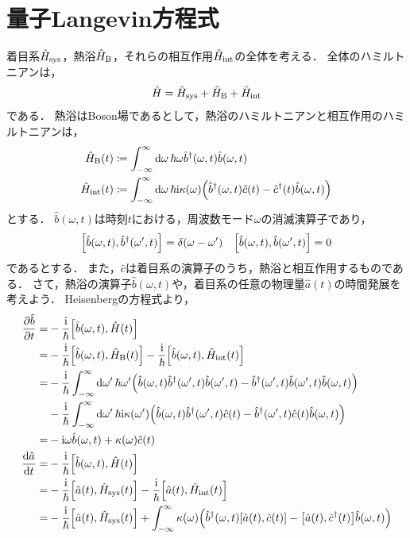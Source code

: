 \documentclass{report}
\begin{document}
    \section{量子Langevin方程式}
      着目系$\hat{H}_{\mathrm{sys}}$，熱浴$\hat{H}_{\mathrm{B}}$，それらの相互作用$\hat{H}_{\mathrm{int}}$の全体を考える．
      全体のハミルトニアンは，
      \begin{align}
        \hat{H} = \hat{H}_{\mathrm{sys}} + \hat{H}_{\mathrm{B}} + \hat{H}_{\mathrm{int}}
      \end{align}
      である．
      熱浴はBoson場であるとして，熱浴のハミルトニアンと相互作用のハミルトニアンは，
      \begin{align}
        \hat{H}_{\mathrm{B}}(t) &\coloneqq \int_{-\infty}^{\infty}\dd{\omega} \hbar\omega \hat{b}^{\dag}(\omega, t)\hat{b}(\omega, t) \\ 
        \hat{H}_{\mathrm{int}}(t) &\coloneqq \int_{-\infty}^{\infty}\dd{\omega} \hbar\mathrm{i}\kappa(\omega)\qty(\hat{b}^{\dag}(\omega, t)\hat{c}(t) - \hat{c}^{\dag}(t)\hat{b}(\omega, t))
      \end{align}
      とする．
      $\hat{b}(\omega, t)$は時刻$t$における，周波数モード$\omega$の消滅演算子であり，
      \begin{align}
        \qty[\hat{b}(\omega, t), \hat{b}^{\dag}(\omega', t)] = \delta(\omega - \omega')\quad \qty[\hat{b}(\omega, t), \hat{b}(\omega', t)] = 0
      \end{align}
      であるとする．
      また，$\hat{c}$は着目系の演算子のうち，熱浴と相互作用するものである．
      さて，熱浴の演算子$\hat{b}(\omega, t)$や，着目系の任意の物理量$\hat{a}(t)$の時間発展を考えよう．
      Heisenbergの方程式より，
      \begin{align}
        \pdv{\hat{b}}{t}(\omega, t) =& -\frac{\mathrm{i}}{\hbar}\qty[\hat{b}(\omega, t), \hat{H}(t)] \\ 
        =& -\frac{\mathrm{i}}{\hbar}\qty[\hat{b}(\omega, t), \hat{H}_{\mathrm{B}}(t)] - \frac{\mathrm{i}}{\hbar}\qty[\hat{b}(\omega, t), \hat{H}_{\mathrm{int}}(t)] \\ 
        =& -\frac{\mathrm{i}}{\hbar}\int_{-\infty}^{\infty}\dd{\omega'} \hbar\omega'\qty(\hat{b}(\omega, t)\hat{b}^{\dag}(\omega', t)\hat{b}(\omega', t) - \hat{b}^{\dag}(\omega', t)\hat{b}(\omega', t)\hat{b}(\omega, t)) \\ 
        &- \frac{\mathrm{i}}{\hbar}\int_{-\infty}^{\infty}\dd{\omega'} \hbar\mathrm{i}\kappa(\omega')\qty(\hat{b}(\omega, t)\hat{b}^{\dag}(\omega', t)\hat{c}(t) - \hat{b}^{\dag}(\omega', t)\hat{c}(t)\hat{b}(\omega, t)) \\ 
        =& -\mathrm{i}\omega\hat{b}(\omega, t) + \kappa(\omega)\hat{c}(t) \\ 
        \dv{\hat{a}}{t}(t) =& -\frac{\mathrm{i}}{\hbar}\qty[\hat{b}(\omega, t), \hat{H}(t)] \\ 
        =& -\frac{\mathrm{i}}{\hbar}\qty[\hat{a}(t), \hat{H}_{\mathrm{sys}}(t)] - \frac{\mathrm{i}}{\hbar}\qty[\hat{a}(t), \hat{H}_{\mathrm{int}}(t)] \\ 
        =& -\frac{\mathrm{i}}{\hbar}\qty[\hat{a}(t), \hat{H}_{\mathrm{sys}}(t)] + \int_{-\infty}^{\infty}\kappa(\omega)\qty(\hat{b}^{\dag}(\omega, t)\qty[\hat{a}(t), \hat{c}(t)] - \qty[\hat{a}(t), \hat{c}^{\dag}(t)]\hat{b}(\omega, t))
      \end{align}
\end{document}

